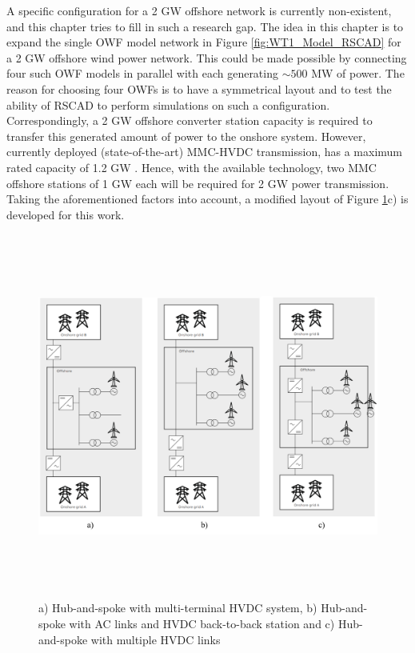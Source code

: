 A specific configuration for a 2 GW offshore network is currently non-existent, and this chapter tries to fill in such a research gap. The idea in this chapter is to expand the single \gls{OWF} model network in Figure \ref{fig:WT1_Model_RSCAD} for a 2 GW offshore wind power network. This could be made possible by connecting four such \gls{OWF} models in parallel with each generating $\sim{500}$ MW of power. The reason for choosing four \gls{OWF}s is to have a symmetrical layout and to test the ability of RSCAD to perform simulations on such a configuration. Correspondingly, a 2 GW offshore converter station capacity is required to transfer this generated amount of power to the onshore system. However, currently deployed (state-of-the-art) \gls{MMC}-\gls{HVDC} transmission, has a maximum rated capacity of 1.2 GW \cite{peralta2012detailed}. Hence, with the available technology, two \gls{MMC} offshore stations of 1 GW each will be required for 2 GW power transmission. Taking the aforementioned factors into account, a modified layout of Figure \ref{fig:ABB_Hub_Spoke_3}c) is developed for this work. 

\begin{figure}[H]
\centering
    \includegraphics[height = 12cm,width = \textwidth]{Diagrams/Chapter_4/ABB_Hub_Spoke_3.png}
    \caption{a) Hub-and-spoke with multi-terminal HVDC system, b) Hub-and-spoke with AC links and HVDC back-to-back station and c) Hub-and-spoke with multiple HVDC links \cite{abb_hvdc_2018}}
    \label{fig:ABB_Hub_Spoke_3}
\end{figure}

